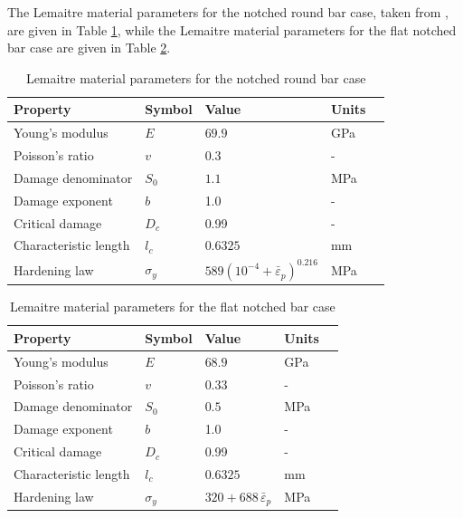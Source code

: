 \documentclass[sn-mathphys,Numbered]{sn-jnl}%
\begin{document}
The Lemaitre material parameters for the notched round bar case, taken from \citet{cesar_de_sa_damage_2006}, are given in Table \ref{table:NRB_material_properties_lemaitre}, while the Lemaitre material parameters for the flat notched bar case are given in Table \ref{table:FNB_material_properties_lemaitre}.
\begin{table}[htb]
	\centering
		\begin{tabular}{lllll} \hline
			Property & Symbol & Value & Units \\ \hline 
			Young's modulus & $E$ & $69.9$ & GPa \\
			Poisson's ratio & $v$ & $0.3$  & - \\
			Damage denominator & $S_0$ & $1.1$ & MPa  \\
			Damage exponent & $b$ & 1.0 & - \\
			Critical damage & $D_c$ & 0.99 & - \\
			Characteristic length & $l_c$ & $0.6325$ & mm  \\
			Hardening law & $\sigma_y$ & $589({10^{-4} +\bar{\varepsilon}}_p)^{0.216}$ & MPa \\
			\hline
		\end{tabular}
	\caption{Lemaitre material parameters for the notched round bar case}
	\label{table:NRB_material_properties_lemaitre}
\end{table}
\begin{table}[htb]
	\centering
		\begin{tabular}{lllll} \hline
			Property & Symbol & Value & Units  \\ \hline 
			Young's modulus & $E$ & $68.9$ & GPa \\
			Poisson's ratio & $v$ & $0.33$  & - \\
			Damage denominator & $S_0$ & $0.5$ & MPa  \\
			Damage exponent & $b$ & 1.0 & -  \\
			Critical damage & $D_c$ & 0.99 & - \\
			Characteristic length & $l_c$ & $0.6325$ & mm  \\
			Hardening law & $\sigma_y$ & $320+688 \, \bar{\varepsilon}_p$ & MPa \\
			\hline
		\end{tabular}
	\caption{Lemaitre material parameters for the flat notched bar case}
	\label{table:FNB_material_properties_lemaitre}
\end{table}
\end{document}
